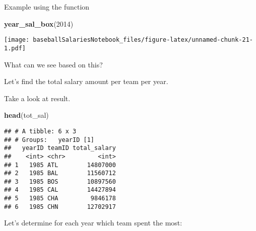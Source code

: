 \documentclass[]{article}
\newenvironment{Shaded}{\begin{snugshade}}{\end{snugshade}}
\newcommand{\KeywordTok}[1]{\textcolor[rgb]{0.13,0.29,0.53}{\textbf{#1}}}
\newcommand{\DataTypeTok}[1]{\textcolor[rgb]{0.13,0.29,0.53}{#1}}
\newcommand{\DecValTok}[1]{\textcolor[rgb]{0.00,0.00,0.81}{#1}}
\newcommand{\StringTok}[1]{\textcolor[rgb]{0.31,0.60,0.02}{#1}}
\newcommand{\CommentTok}[1]{\textcolor[rgb]{0.56,0.35,0.01}{\textit{#1}}}
\newcommand{\OperatorTok}[1]{\textcolor[rgb]{0.81,0.36,0.00}{\textbf{#1}}}
\newcommand{\NormalTok}[1]{#1}
\begin{document}
Example using the function

\begin{Shaded}
\begin{Highlighting}[]
\KeywordTok{year_sal_box}\NormalTok{(}\DecValTok{2014}\NormalTok{)}
\end{Highlighting}
\end{Shaded}

\texttt{[image: baseballSalariesNotebook\_files/figure-latex/unnamed-chunk-21-1.pdf]}

What can we see based on this?

Let's find the total salary amount per team per year.

\begin{Shaded}
\end{Shaded}

Take a look at result.

\begin{Shaded}
\begin{Highlighting}[]
\KeywordTok{head}\NormalTok{(tot_sal)}
\end{Highlighting}
\end{Shaded}

\begin{verbatim}
## # A tibble: 6 x 3
## # Groups:   yearID [1]
##   yearID teamID total_salary
##    <int> <chr>         <int>
## 1   1985 ATL        14807000
## 2   1985 BAL        11560712
## 3   1985 BOS        10897560
## 4   1985 CAL        14427894
## 5   1985 CHA         9846178
## 6   1985 CHN        12702917
\end{verbatim}

Let's determine for each year which team spent the most:

\begin{Shaded}
\end{Shaded}
\end{document}
